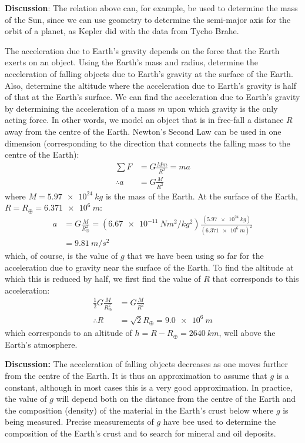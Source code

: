 \begin{example}
\textbf{Discussion}: The relation above can, for example, be used to determine the mass of the Sun, since we can use geometry to determine the semi-major axis for the orbit of a planet, as Kepler did with the data from Tycho Brahe.
\end{example}
\vspace{-0.5cm}
\begin{example}{\label{ex:gravity:gofr}The acceleration due to Earth's gravity depends on the force that the Earth exerts on an object. Using the Earth's mass and radius, determine the acceleration of falling objects due to Earth's gravity at the surface of the Earth. Also, determine the altitude where the acceleration due to Earth's gravity is half of that at the Earth's surface.}
We can find the acceleration due to Earth's gravity by determining the acceleration of a mass $m$ upon which gravity is the only acting force. In other words, we model an object that is in free-fall a distance $R$ away from the centre of the Earth. Newton's Second Law can be used in one dimension (corresponding to the direction that connects the falling mass to the centre of the Earth):
\begin{align*}
\sum F &= G\frac{Mm}{R^2}=ma\\
\therefore a&=G\frac{M}{R^2}
\end{align*}
where $M=\SI{5.97e24}{kg}$ is the mass of the Earth. At the surface of the Earth, $R=R_\oplus=\SI{6.371e6}{m}$:
\begin{align*}
a&=G\frac{M}{R_\oplus^2}=(\SI{6.67e-11}{Nm^2/kg^2})\frac{(\SI{5.97e24}{kg})}{(\SI{6.371e6}{m})^2}\\
&=\SI{9.81}{m/s^2}
\end{align*}
which, of course, is the value of $g$ that we have been using so far for the acceleration due to gravity near the surface of the Earth. To find the altitude at which this is reduced by half, we first find the value of $R$ that corresponds to this acceleration:
\begin{align*}
\frac{1}{2}G\frac{M}{R_\oplus^2}&=G\frac{M}{R^2}\\
\therefore R &=\sqrt{2}R_\oplus = \SI{9.0e6}{m}
\end{align*}
which corresponds to an altitude of $h=R-R_\oplus=\SI{2640}{km}$, well above the Earth's atmosphere.

\textbf{Discussion:} The acceleration of falling objects decreases as one moves further from the centre of the Earth. It is thus an approximation to assume that $g$ is a constant, although in most cases this is a very good approximation. In practice, the value of $g$ will depend both on the distance from the centre of the Earth and the composition (density) of the material in the Earth's crust below where $g$ is being measured. Precise measurements of $g$ have bee used to determine the composition of the Earth's crust and to search for mineral and oil deposits.
\end{example}


